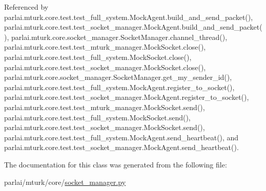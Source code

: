 Referenced by parlai.\+mturk.\+core.\+test.\+test\+\_\+full\+\_\+system.\+Mock\+Agent.\+build\+\_\+and\+\_\+send\+\_\+packet(), parlai.\+mturk.\+core.\+test.\+test\+\_\+socket\+\_\+manager.\+Mock\+Agent.\+build\+\_\+and\+\_\+send\+\_\+packet(), parlai.\+mturk.\+core.\+socket\+\_\+manager.\+Socket\+Manager.\+channel\+\_\+thread(), parlai.\+mturk.\+core.\+test.\+test\+\_\+mturk\+\_\+manager.\+Mock\+Socket.\+close(), parlai.\+mturk.\+core.\+test.\+test\+\_\+full\+\_\+system.\+Mock\+Socket.\+close(), parlai.\+mturk.\+core.\+test.\+test\+\_\+socket\+\_\+manager.\+Mock\+Socket.\+close(), parlai.\+mturk.\+core.\+socket\+\_\+manager.\+Socket\+Manager.\+get\+\_\+my\+\_\+sender\+\_\+id(), parlai.\+mturk.\+core.\+test.\+test\+\_\+full\+\_\+system.\+Mock\+Agent.\+register\+\_\+to\+\_\+socket(), parlai.\+mturk.\+core.\+test.\+test\+\_\+socket\+\_\+manager.\+Mock\+Agent.\+register\+\_\+to\+\_\+socket(), parlai.\+mturk.\+core.\+test.\+test\+\_\+mturk\+\_\+manager.\+Mock\+Socket.\+send(), parlai.\+mturk.\+core.\+test.\+test\+\_\+full\+\_\+system.\+Mock\+Socket.\+send(), parlai.\+mturk.\+core.\+test.\+test\+\_\+socket\+\_\+manager.\+Mock\+Socket.\+send(), parlai.\+mturk.\+core.\+test.\+test\+\_\+full\+\_\+system.\+Mock\+Agent.\+send\+\_\+heartbeat(), and parlai.\+mturk.\+core.\+test.\+test\+\_\+socket\+\_\+manager.\+Mock\+Agent.\+send\+\_\+heartbeat().



The documentation for this class was generated from the following file\+:\begin{DoxyCompactItemize}
\item 
parlai/mturk/core/\hyperlink{socket__manager_8py}{socket\+\_\+manager.\+py}\end{DoxyCompactItemize}
